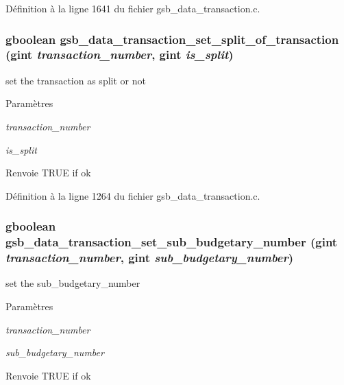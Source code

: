 Définition à la ligne 1641 du fichier gsb\_\-data\_\-transaction.c.

\subsubsection[{gsb\_\-data\_\-transaction\_\-set\_\-split\_\-of\_\-transaction}]{\setlength{\rightskip}{0pt plus 5cm}gboolean gsb\_\-data\_\-transaction\_\-set\_\-split\_\-of\_\-transaction (gint {\em transaction\_\-number}, \/  gint {\em is\_\-split})}\label{gsb__data__transaction_8c_a6296340e0b31e2f5433b37924b86b3e6}
set the transaction as split or not


\begin{DoxyParams}{Paramètres}
\item[{\em transaction\_\-number}]\item[{\em is\_\-split}]\end{DoxyParams}
\begin{DoxyReturn}{Renvoie}
TRUE if ok 
\end{DoxyReturn}


Définition à la ligne 1264 du fichier gsb\_\-data\_\-transaction.c.

\subsubsection[{gsb\_\-data\_\-transaction\_\-set\_\-sub\_\-budgetary\_\-number}]{\setlength{\rightskip}{0pt plus 5cm}gboolean gsb\_\-data\_\-transaction\_\-set\_\-sub\_\-budgetary\_\-number (gint {\em transaction\_\-number}, \/  gint {\em sub\_\-budgetary\_\-number})}\label{gsb__data__transaction_8c_aae141d1ea0866286b7d86231862e2b0a}
set the sub\_\-budgetary\_\-number 
\begin{DoxyParams}{Paramètres}
\item[{\em transaction\_\-number}]\item[{\em sub\_\-budgetary\_\-number}]\end{DoxyParams}
\begin{DoxyReturn}{Renvoie}
TRUE if ok 
\end{DoxyReturn}


